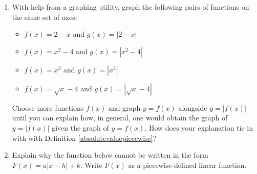 \documentclass{ximera}
\begin{document}
\newpage

\begin{enumerate}
\setcounter{enumi}{\value{HW}}

\item \label{makeaveewithabsval} With help from a graphing utility, graph the following pairs of functions on the same set of axes:

\begin{multicols}{2}

\begin{itemize}


\item  $f(x) = 2-x$ and $g(x) = | 2-x |$

\item  $f(x) = x^2-4$ and $g(x) = | x^2 -4 |$

\end{itemize}

\end{multicols}

\begin{multicols}{2}

\begin{itemize}

\item  $f(x) = x^3$ and $g(x) = | x^3 |$

\item  $f(x) = \sqrt{x}-4 $ and $g(x) = | \sqrt{x} -4| $

\end{itemize}

\end{multicols}


Choose more functions $f(x)$ and graph $y = f(x)$ alongside $y = | f(x)|$ until you can explain how, in general, one would obtain the graph of $y = | f(x) |$ given the graph of $y = f(x)$.  How does your explanation tie in with  with Definition \ref{absolutevaluepiecewise}?



\item Explain why the function below cannot be written in the form $F(x) = a|x-h|+k$.  Write $F(x)$ as a piecewise-defined linear function.

\begin{center}


\end{center}
\end{enumerate}
\end{document}

